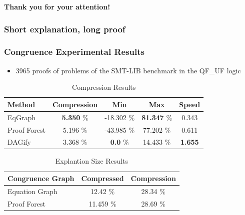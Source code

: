 \documentclass{beamer}
\begin{document}
\begin{frame}

\centering \textbf{\LARGE{Thank you for your attention!}}

\end{frame}

\begin{frame}

\frametitle{Short explanation, long proof}



\end{frame}

\begin{frame}

\frametitle{Congruence Experimental Results}

\begin{itemize}
		\item 3965 proofs of problems of the SMT-LIB benchmark in the QF\_UF logic
\end{itemize}

\begin{table}[h]
\centering
\begin{tabular}{l c c c c}
\toprule
\textbf{Method} & \textbf{Compression} & \textbf{Min} & \textbf{Max} & \textbf{Speed}\\ 
\midrule

EqGraph & \textbf{5.350} \% & -18.302 \% & \textbf{81.347} \% & 0.343 \\ 
Proof Forest &  5.196 \% & -43.985 \% & 77.202 \% & 0.611 \\ 
DAGify & 3.368 \% & \textbf{0.0} \% & 14.433 \% & \textbf{1.655} \\ 

\bottomrule
\end{tabular}
\caption{Compression Results}
\label{tab:congruence_results}
\end{table}

\begin{table}[h]
\centering
\begin{tabular}{l c c}
\toprule
\textbf{Congruence Graph} & \textbf{Compressed} & \textbf{Compression} \\ 
\midrule

Equation Graph & 12.42 \% & 28.34 \% \\ 
Proof Forest & 11.459 \% & 28.69 \% \\ 

\bottomrule
\end{tabular}
\caption{Explantion Size Results}
\label{tab:explanation_results}
\end{table}

\end{frame}
\end{document}
